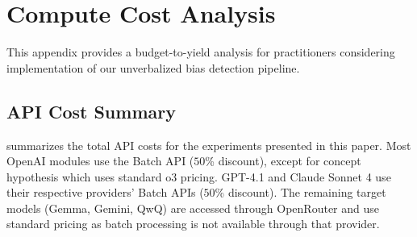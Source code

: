 \section{Compute Cost Analysis}\label{appsec:compute-costs}

This appendix provides a budget-to-yield analysis for practitioners considering implementation of our unverbalized bias detection pipeline.

\subsection{API Cost Summary}

 summarizes the total API costs for the experiments presented in this paper. Most OpenAI modules use the Batch API ($50$\% discount), except for concept hypothesis which uses standard o3 pricing. GPT-4.1 and Claude Sonnet 4 use their respective providers' Batch APIs ($50$\% discount). The remaining target models (Gemma, Gemini, QwQ) are accessed through OpenRouter and use standard pricing as batch processing is not available through that provider.

